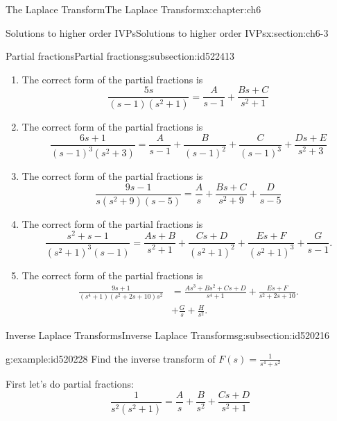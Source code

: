 \documentclass[oneside,10pt,]{book}
\numberwithin{equation}{section}
\numberwithin{equation}{section}
\newcommand{\amp}{&}
\begin{document}
\begin{chapterptx}{The Laplace Transform}{}{The Laplace Transform}{}{}{x:chapter:ch6}
\begin{sectionptx}{Solutions to higher order IVPs}{}{Solutions to higher order IVPs}{}{}{x:section:ch6-3}
\begin{subsectionptx}{Partial fractions}{}{Partial fractions}{}{}{g:subsection:id522413}
\begin{enumerate}
\item{}The correct form of the partial fractions is%
\begin{equation*}
\frac{5s}{\left(s-1\right)\left(s^{2}+1\right)}=\frac{A}{s-1}+\frac{Bs+C}{s^{2}+1}
\end{equation*}
%
\item{}The correct form of the partial fractions is%
\begin{equation*}
\frac{6s+1}{\left(s-1\right)^{3}\left(s^{2}+3\right)}=\frac{A}{s-1}+\frac{B}{\left(s-1\right)^{2}}+\frac{C}{\left(s-1\right)^{3}}+\frac{Ds+E}{s^{2}+3}
\end{equation*}
%
\item{}The correct form of the partial fractions is%
\begin{equation*}
\frac{9s-1}{s\left(s^{2}+9\right)\left(s-5\right)}=\frac{A}{s}+\frac{Bs+C}{s^{2}+9}+\frac{D}{s-5}
\end{equation*}
%
\item{}The correct form of the partial fractions is%
\begin{equation*}
\frac{s^{2}+s-1}{\left(s^{2}+1\right)^{3}\left(s-1\right)}=\frac{As+B}{s^{2}+1}+\frac{Cs+D}{\left(s^{2}+1\right)^{2}}+\frac{Es+F}{\left(s^{2}+1\right)^{3}}+\frac{G}{s-1}.
\end{equation*}
%
\item{}The correct form of the partial fractions is%
\begin{align*}
\frac{9s+1}{\left(s^{4}+1\right)\left(s^{2}+2s+10\right)s^{2}} \amp =\frac{As^{3}+Bs^{2}+Cs+D}{s^{4}+1}+\frac{Es+F}{s^{2}+2s+10}.\\
\amp +\frac{G}{s}+\frac{H}{s^{2}}.
\end{align*}
%
\end{enumerate}
%
\end{subsectionptx}
%
%
\typeout{************************************************}
\typeout{************************************************}
%
\begin{subsectionptx}{Inverse Laplace Transforms}{}{Inverse Laplace Transforms}{}{}{g:subsection:id520216}
\begin{example}{}{g:example:id520228}%
Find the inverse transform of \(F(s)=\frac{1}{s^{4}+s^{2}}\)%
\par
First let's do partial fractions:%
\begin{equation*}
\frac{1}{s^{2}\left(s^{2}+1\right)}=\frac{A}{s}+\frac{B}{s^{2}}+\frac{Cs+D}{s^{2}+1}

\end{equation*}
\end{example}
\end{subsectionptx}
\end{sectionptx}
\end{chapterptx}
\end{document}
